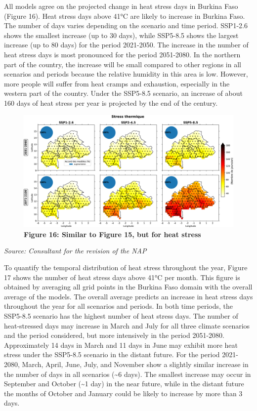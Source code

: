 \documentclass[
]{book}
\begin{document}
All models agree on the projected change in heat stress days in Burkina Faso (Figure 16). Heat stress days above 41°C are likely to increase in Burkina Faso. The number of days varies depending on the scenario and time period. SSP1-2.6 shows the smallest increase (up to 30 days), while SSP5-8.5 shows the largest increase (up to 80 days) for the period 2021-2050. The increase in the number of heat stress days is most pronounced for the period 2051-2080. In the northern part of the country, the increase will be small compared to other regions in all scenarios and periods because the relative humidity in this area is low. However, more people will suffer from heat cramps and exhaustion, especially in the western part of the country. Under the SSP5-8.5 scenario, an increase of about 160 days of heat stress per year is projected by the end of the century.

\begin{figure}
\centering
\includegraphics{Figures and Photos/Figure 16.png}
\caption{\textbf{Figure 16: Similar to Figure 15, but for heat stress}}
\end{figure}

\emph{Source: Consultant for the revision of the NAP}

To quantify the temporal distribution of heat stress throughout the year, Figure 17 shows the number of heat stress days above 41°C per month. This figure is obtained by averaging all grid points in the Burkina Faso domain with the overall average of the models. The overall average predicts an increase in heat stress days throughout the year for all scenarios and periods. In both time periods, the SSP5-8.5 scenario has the highest number of heat stress days. The number of heat-stressed days may increase in March and July for all three climate scenarios and the period considered, but more intensively in the period 2051-2080. Approximately 14 days in March and 11 days in June may exhibit more heat stress under the SSP5-8.5 scenario in the distant future. For the period 2021-2080, March, April, June, July, and November show a slightly similar increase in the number of days in all scenarios (\textasciitilde6 days). The smallest increase may occur in September and October (\textasciitilde1 day) in the near future, while in the distant future the months of October and January could be likely to increase by more than 3 days.
\end{document}
